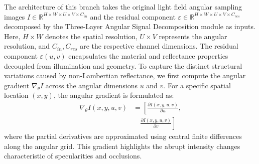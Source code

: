 \documentclass[lettersize,journal]{IEEEtran}
\begin{document}
The architecture of this branch takes the original light field angular sampling images $I \in \mathbb{R}^{H \times W \times U \times V \times C_{in}}$ and the residual component $\varepsilon \in \mathbb{R}^{H \times W \times U \times V \times C_{res}}$ decomposed by the Three-Layer Angular Signal Decomposition module as inputs. Here, $H \times W$ denotes the spatial resolution, $U \times V$ represents the angular resolution, and $C_{in}, C_{res}$ are the respective channel dimensions. The residual component $\varepsilon(u,v)$ encapsulates the material and reflectance properties decoupled from illumination and geometry. To capture the distinct structural variations caused by non-Lambertian reflectance, we first compute the angular gradient $\nabla_{\theta} I$ across the angular dimensions $u$ and $v$. For a specific spatial location $(x,y)$, the angular gradient is formulated as:
\begin{equation}
\begin{aligned}
\nabla_{\theta} I(x,y,u,v) &= \left[ \frac{\partial I(x,y,u,v)}{\partial u}, \right. \\
&\quad \left. \frac{\partial I(x,y,u,v)}{\partial v} \right]
\end{aligned}
\end{equation}
where the partial derivatives are approximated using central finite differences along the angular grid. This gradient highlights the abrupt intensity changes characteristic of specularities and occlusions.
\end{document}
